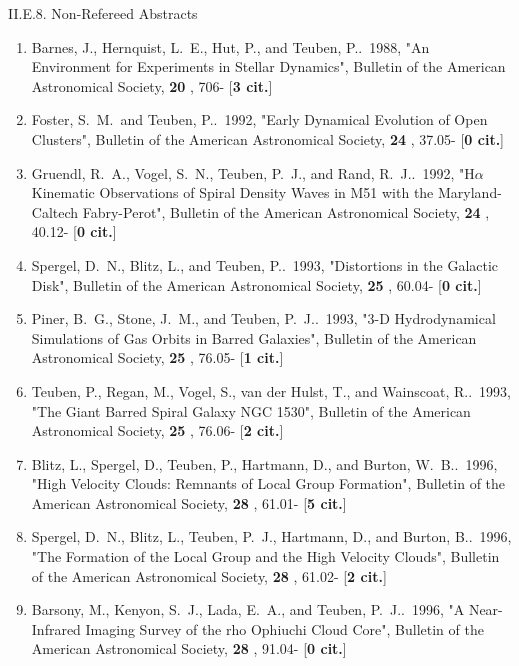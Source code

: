 \documentclass[11pt,letterpaper]{article}
\begin{document}




II.E.8. Non-Refereed Abstracts


\begin{enumerate}[resume,label=\textbf{\arabic*}.]

\item  
Barnes, J., Hernquist, L.~E., Hut, P., and Teuben, P..\  1988,  "An 
Environment for Experiments in Stellar Dynamics", Bulletin of the American 
Astronomical Society,  {\bf 20} , 706- [{\bf 3 cit.}] 
\item  
Foster, S.~M.~and Teuben, P..\  1992,  "Early Dynamical Evolution of Open 
Clusters", Bulletin of the American Astronomical Society,  {\bf 24} , 
37.05- [{\bf 0 cit.}] 
\item  
Gruendl, R.~A., Vogel, S.~N., Teuben, P.~J., and Rand, R.~J..\  1992,  
"H{$\alpha$} Kinematic Observations of Spiral Density Waves in M51 with the 
Maryland-Caltech Fabry-Perot", Bulletin of the American Astronomical 
Society,  {\bf 24} , 40.12- [{\bf 0 cit.}] 
\item  
Spergel, D.~N., Blitz, L., and Teuben, P..\  1993,  "Distortions in the 
Galactic Disk", Bulletin of the American Astronomical Society,  {\bf 25} , 
60.04- [{\bf 0 cit.}] 

\item  
Piner, B.~G., Stone, J.~M., and Teuben, P.~J..\  1993,  "3-D Hydrodynamical 
Simulations of Gas Orbits in Barred Galaxies", Bulletin of the American 
Astronomical Society,  {\bf 25} , 76.05- [{\bf 1 cit.}] 
\item  
Teuben, P., Regan, M., Vogel, S., van der Hulst, T., and Wainscoat, R..\  
1993,  "The Giant Barred Spiral Galaxy NGC 1530", Bulletin of the American 
Astronomical Society,  {\bf 25} , 76.06- [{\bf 2 cit.}] 
\item  
Blitz, L., Spergel, D., Teuben, P., Hartmann, D., and Burton, W.~B..\  
1996,  "High Velocity Clouds: Remnants of Local Group Formation", Bulletin 
of the American Astronomical Society,  {\bf 28} , 61.01- [{\bf 5 cit.}] 

\item  
Spergel, D.~N., Blitz, L., Teuben, P.~J., Hartmann, D., and Burton, B..\  
1996,  "The Formation of the Local Group and the High Velocity Clouds", 
Bulletin of the American Astronomical Society,  {\bf 28} , 61.02- [{\bf 2 
cit.}] 
\item  
Barsony, M., Kenyon, S.~J., Lada, E.~A., and Teuben, P.~J..\  1996,  "A 
Near-Infrared Imaging Survey of the rho Ophiuchi Cloud Core", Bulletin of 
the American Astronomical Society,  {\bf 28} , 91.04- [{\bf 0 cit.}] 


\end{enumerate}
\end{document}
